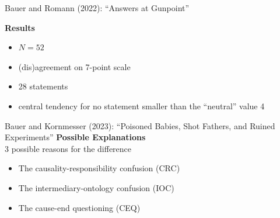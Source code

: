 \documentclass[xcolor=table,9pt,aspectratio=169]{beamer}
\begin{document}
\begin{frame}{\vspace*{10mm}Bauer and Romann (2022): ``Answers at Gunpoint''}
\vspace*{-5mm}
\begin{multicols}{2}
\textbf{Results}\\
\begin{itemize}
   \item $N=52$
   \item (dis)agreement on 7-point scale
   \item 28 statements
   \item central tendency for no statement smaller than the ``neutral'' value 4
\end{itemize}
\vfill
\begin{center}
\end{center}
\end{multicols}
\end{frame}


\begin{frame}{\vspace*{10mm}Bauer and Kornmesser (2023): ``Poisoned Babies, Shot Fathers, and Ruined Experiments''}
\vspace*{-5mm}
\textbf{Possible Explanations}\\
3 possible reasons for the difference
\begin{itemize}
   \item The causality-responsibility confusion (CRC)
   \item The intermediary-ontology confusion (IOC)
   \item The cause-end questioning (CEQ)
\end{itemize}
\vfill
\end{frame}
\end{document}
